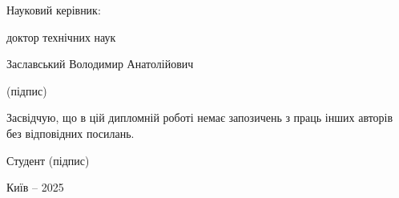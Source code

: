\begin{titlepage}
\begin{minipage}[t]{0.9\textwidth}
        \vspace{1.5cm} %
        
        Науковий керівник:\par
        доктор технічних наук\par %
        Заславський Володимир Анатолійович\par %
        \vspace{0.5cm}
        \underline{\hspace{5cm}} (підпис)
    \end{minipage}

    \vspace{1cm} %

    \begin{center}
      \begin{minipage}{0.6\textwidth}
          \fontsize{11}{13}\selectfont
          Засвідчую, що в цій дипломній роботі немає запозичень з праць інших авторів без відповідних посилань.
          \vspace{0.5cm}\par
          Студент \hfill \underline{\hspace{4cm}} (підпис)
      \end{minipage}
    \end{center}

    \vfill %

    {\fontsize{12}{14}\selectfont Київ – 2025\par}
    \vspace*{0.5cm} %

\end{titlepage} 